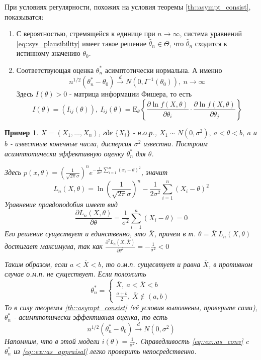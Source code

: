 \documentclass[12pt]{article}
\newtheorem*{example}{Пример}
\theoremstyle{basic_theorem}
\theoremstyle{name_theorem}
\def\E{
    \mathrm{E}
}
\begin{document}
    При условиях регулярности, похожих на условия теоремы \ref{th::asympt_consist},
    показыватся:
    \begin{enumerate}
        \item С вероятностью, стремящейся к единице при $n \rightarrow \infty$,
            система уравнений \eqref{eq::sys_plausibility} имеет такое решение $\hat{\theta}_n\in\Theta$,
            что $\hat{\theta}_n$ сходится к истинному значению $\theta_0$.
        \item Соответствующая оценка $\theta^*_n$ асимптотически нормальна. А именно
         $$n^{1/2}(\theta^*_n - \theta_0) \xrightarrow{d} N(0, I^{-1}(\theta_0)),\ n\rightarrow\infty$$
         Здесь $I(\theta) > 0$ - матрица информации Фишера, то есть
         $$I(\theta) = (I_{ij}(\theta)),\ I_{ij}(\theta) = \E_\theta \left\{\frac{\partial \ln f(X, \theta)}{\partial\theta_i} \cdot \frac{\partial\ln f(X, \theta)}{\partial\theta_j}\right\}$$ 
    \end{enumerate}
\begin{example}
        $X = (X_1, \ldots, X_n)$, где $\{X_i\}$ - н.о.р., $X_1 \sim N(0, \sigma^2),\ a < \theta < b$,
        $a$ и $b$ - известные конечные числа, дисперсия $\sigma^2$ известна.
        Построим асимптотически эффективную оценку $\theta^*_n$ для $\theta$.

        Здесь $p(x, \theta) = \left(\frac{1}{\sqrt{2\pi} \sigma}\right)^ne^{-\frac{1}{2\sigma^2}\sum_{i=1}^n (x_i-\theta)^2}$,
        значит
        $$L_n(X, \theta) = \ln\left(\frac{1}{\sqrt{2\pi}\sigma}\right)^n - \frac{1}{2\sigma^2}\sum_{i=1}^n(X_i-\theta)^2$$
        Уравнение правдоподобия имеет вид
        $$\frac{\partial L_n(X, \theta)}{\partial\theta} = \frac{1}{\sigma^2}\sum_{i=1}^n(X_i - \theta) = 0$$
        Его решение существует и единственно, это $\overline{X}$, причем
        в т. $\theta = \overline{X}\ L_n(X,\theta)$ достигает максимума,
        так как $\frac{\partial^2 L_n(X, \overline{X})}{\partial\theta^2} = - \frac{1}{\sigma^2} < 0$

        Таким образом, если $a < \overline{X} < b$, то о.м.п. сущесвтует и равна $\overline{X}$,
        в противном случае о.м.п. не существует. Если положить
        \begin{equation}
            \label{eq::ex::as_appraisal}
            \theta^*_n = \begin{cases}
                \overline{X},\ a < \overline{X} < b \\
                \frac{a+b}{2},\ \overline{X} \notin (a,b) 
            \end{cases}
        \end{equation}
        То в силу теоремы \ref{th::asympt_consist} (её условия
        выполнены, проверьте сами), $\theta^*_n$ - асимптотически эффективная оценка, то есть
        \begin{equation}
            \label{eq::ex::as_conv}
            n^{1/2}(\theta^*_n - \theta_0) \xrightarrow{d} N(0, \sigma^2)
        \end{equation}
        Напомним, что в этой модели $i(\theta) = \frac{1}{\sigma^2}$.
        Cправедливость \eqref{eq::ex::as_conv} c $\theta^*_n$
        из \eqref{eq::ex::as_appraisal} легко проверить непосредственно.
\end{example}
\end{document}
